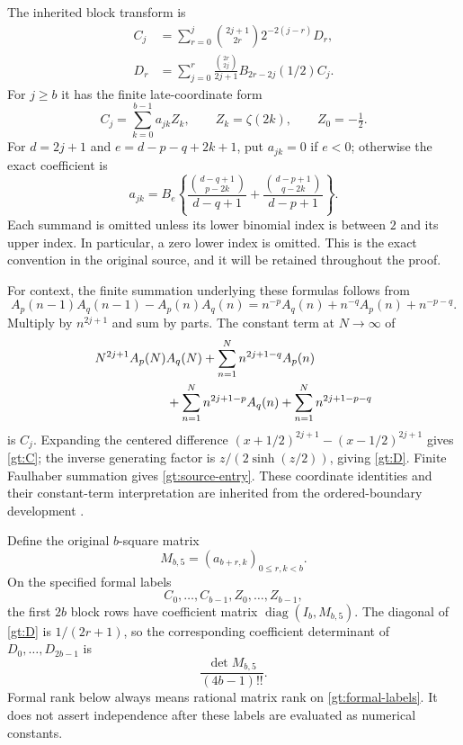 \documentclass[11pt,a4paper]{article}
\theoremstyle{definition}
\theoremstyle{remark}
\numberwithin{equation}{section}
\begin{document}
The inherited block transform is
\begin{align}
 C_j&=\sum_{r=0}^{j}\binom{2j+1}{2r}2^{-2(j-r)}D_r,
       \label{gt:C}\\
 D_r&=\sum_{j=0}^{r}\frac{\binom{2r}{2j}}{2j+1}
                      B_{2r-2j}(1/2)C_j.\label{gt:D}
\end{align}
For $j\ge b$ it has the finite late-coordinate form
\begin{equation}\label{gt:late}
 C_j=\sum_{k=0}^{b-1}a_{jk}Z_k,\qquad
 Z_k=\zeta(2k),\qquad Z_0=-\tfrac12.
\end{equation}
For $d=2j+1$ and $e=d-p-q+2k+1$, put $a_{jk}=0$ if $e<0$;
otherwise the exact coefficient is
\begin{equation}\label{gt:source-entry}
 a_{jk}=B_e\left\{
 \frac{\binom{d-q+1}{p-2k}}{d-q+1}
 +\frac{\binom{d-p+1}{q-2k}}{d-p+1}\right\}.
\end{equation}
Each summand is omitted unless its lower binomial index is between
$2$ and its upper index. In particular, a zero lower index is omitted.
This is the exact convention in the original source, and it will be
retained throughout the proof.

For context, the finite summation underlying these formulas follows
from
\[
 A_p(n-1)A_q(n-1)-A_p(n)A_q(n)
 =n^{-p}A_q(n)+n^{-q}A_p(n)+n^{-p-q}.
\]
Multiply by $n^{2j+1}$ and sum by parts. The constant term at
$N\to\infty$ of
\begin{align*}
 &N^{2j+1}A_p(N)A_q(N)
 +\sum_{n=1}^{N} n^{2j+1-q}A_p(n)\\
 &\hspace{20mm}+\sum_{n=1}^{N}n^{2j+1-p}A_q(n)
 +\sum_{n=1}^{N}n^{2j+1-p-q}
\end{align*}
is $C_j$. Expanding the centered difference
$(x+1/2)^{2j+1}-(x-1/2)^{2j+1}$ gives \eqref{gt:C};
the inverse generating factor is $z/(2\sinh(z/2))$, giving
\eqref{gt:D}. Finite Faulhaber summation gives
\eqref{gt:source-entry}. These coordinate identities and their
constant-term interpretation are inherited from the ordered-boundary
development \cite{OrderedBoundary}.

Define the original $b$-square matrix
\[
 M_{b,5}=(a_{b+r,k})_{0\le r,k<b}.
\]
On the specified formal labels
\begin{equation}\label{gt:formal-labels}
 C_0,\ldots,C_{b-1},Z_0,\ldots,Z_{b-1},
\end{equation}
the first $2b$ block rows have coefficient matrix
$\operatorname{diag}(I_b,M_{b,5})$.
The diagonal of \eqref{gt:D} is $1/(2r+1)$, so the corresponding
coefficient determinant of $D_0,\ldots,D_{2b-1}$ is
\begin{equation}\label{gt:prefix-det}
                       \frac{\det M_{b,5}}{(4b-1)!!}.
\end{equation}
Formal rank below always means rational matrix rank on
\eqref{gt:formal-labels}. It does not assert independence after
these labels are evaluated as numerical constants.
\end{document}
